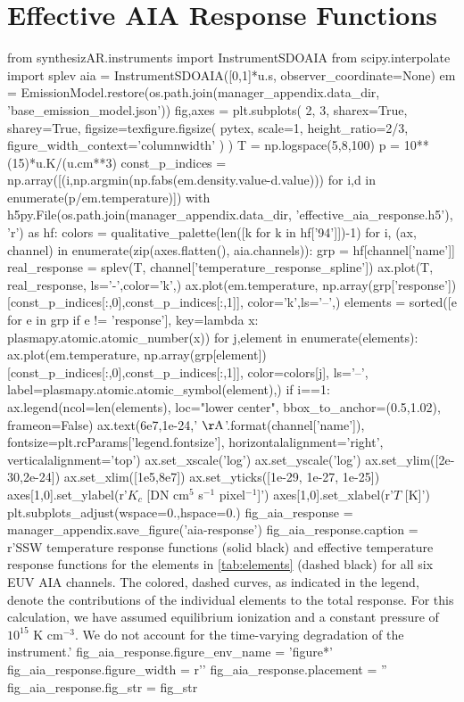 \section{Effective AIA Response Functions}\label{effective_response_functions}

\begin{pycode}
from synthesizAR.instruments import InstrumentSDOAIA
from scipy.interpolate import splev
aia = InstrumentSDOAIA([0,1]*u.s, observer_coordinate=None)
em = EmissionModel.restore(os.path.join(manager_appendix.data_dir, 'base_emission_model.json'))
fig,axes = plt.subplots(
    2, 3, sharex=True, sharey=True,
    figsize=texfigure.figsize(
        pytex, 
        scale=1,
        height_ratio=2/3,       
        figure_width_context='columnwidth'
    )
)
T = np.logspace(5,8,100)
p = 10**(15)*u.K/(u.cm**3)
const_p_indices = np.array([(i,np.argmin(np.fabs(em.density.value-d.value))) 
                            for i,d in enumerate(p/em.temperature)])
with h5py.File(os.path.join(manager_appendix.data_dir, 'effective_aia_response.h5'), 'r') as hf:
    colors = qualitative_palette(len([k for k in hf['94']])-1)
    for i, (ax, channel) in enumerate(zip(axes.flatten(), aia.channels)):
        grp = hf[channel['name']]
        real_response = splev(T, channel['temperature_response_spline'])
        ax.plot(T, real_response, ls='-',color='k',)
        ax.plot(em.temperature, 
                np.array(grp['response'])[const_p_indices[:,0],const_p_indices[:,1]],
                color='k',ls='--',)
        elements = sorted([e for e in grp if e != 'response'],
                            key=lambda x: plasmapy.atomic.atomic_number(x))
        for j,element in enumerate(elements):
            ax.plot(em.temperature, 
                    np.array(grp[element])[const_p_indices[:,0],const_p_indices[:,1]],
                    color=colors[j], ls='--', label=plasmapy.atomic.atomic_symbol(element),)
        if i==1:
            ax.legend(ncol=len(elements), loc="lower center", bbox_to_anchor=(0.5,1.02),
                      frameon=False)
        ax.text(6e7,1e-24,'{} $\mathrm{{\AA}}$'.format(channel['name']),
                fontsize=plt.rcParams['legend.fontsize'],
                horizontalalignment='right', verticalalignment='top')
ax.set_xscale('log')
ax.set_yscale('log')
ax.set_ylim([2e-30,2e-24])
ax.set_xlim([1e5,8e7])
ax.set_yticks([1e-29, 1e-27, 1e-25])
axes[1,0].set_ylabel(r'$K_c$ [DN cm$^5$ s$^{-1}$ pixel$^{-1}$]')
axes[1,0].set_xlabel(r'$T$ [K]')
plt.subplots_adjust(wspace=0.,hspace=0.)
fig_aia_response = manager_appendix.save_figure('aia-response')
fig_aia_response.caption = r'SSW temperature response functions (solid black) and effective temperature response functions for the elements in \autoref{tab:elements} (dashed black) for all six EUV AIA channels. The colored, dashed curves, as indicated in the legend, denote the contributions of the individual elements to the total response. For this calculation, we have assumed equilibrium ionization and a constant pressure of $10^{15}$ K cm$^{-3}$. We do not account for the time-varying degradation of the instrument.'
fig_aia_response.figure_env_name = 'figure*'
fig_aia_response.figure_width = r'\columnwidth'
fig_aia_response.placement = ''
fig_aia_response.fig_str = fig_str
\end{pycode}

